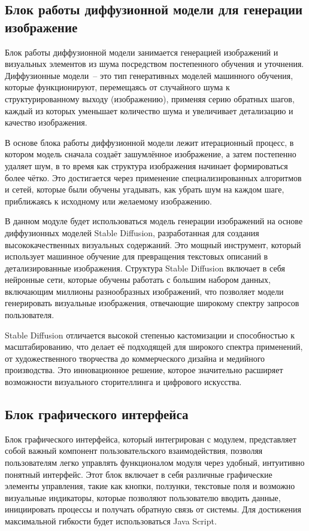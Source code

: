 \subsection{Блок работы диффузионной модели для генерации изображение}

Блок работы диффузионной модели занимается генерацией изображений и визуальных элементов из шума посредством постепенного обучения и уточнения. Диффузионные модели~-- это тип генеративных моделей машинного обучения, которые функционируют, перемещаясь от случайного шума к структурированному выходу (изображению), применяя серию обратных шагов, каждый из которых уменьшает количество шума и увеличивает детализацию и качество изображения.

В основе блока работы диффузионной модели лежит итерационный процесс, в котором модель сначала создаёт зашумлённое изображение, а затем постепенно удаляет шум, в то время как структура изображения начинает формироваться более чётко. Это достигается через применение специализированных алгоритмов и сетей, которые были обучены угадывать, как убрать шум на каждом шаге, приближаясь к исходному или желаемому изображению.

В данном модуле будет использоваться модель генерации изображений на основе диффузионных моделей Stable Diffusion, разработанная для создания высококачественных визуальных содержаний. Это мощный инструмент, который использует машинное обучение для превращения текстовых описаний в детализированные изображения. Структура Stable Diffusion включает в себя нейронные сети, которые обучены работать с большим набором данных, включающим миллионы разнообразных изображений, что позволяет модели генерировать визуальные изображения, отвечающие широкому спектру запросов пользователя.

Stable Diffusion отличается высокой степенью кастомизации и способностью к масштабированию, что делает её подходящей для широкого спектра применений, от художественного творчества до коммерческого дизайна и медийного производства. Это инновационное решение, которое значительно расширяет возможности визуального сторителлинга и цифрового искусства.

\subsection{Блок графического интерфейса}

Блок графического интерфейса, который интегрирован с модулем, представляет собой важный компонент пользовательского взаимодействия, позволяя пользователям легко управлять функционалом модуля через удобный, интуитивно понятный интерфейс. Этот блок включает в себя различные графические элементы управления, такие как кнопки, ползунки, текстовые поля и возможно визуальные индикаторы, которые позволяют пользователю вводить данные, инициировать процессы и получать обратную связь от системы. Для достижения максимальной гибкости будет использоваться Java Script.

